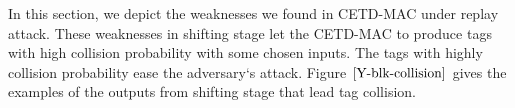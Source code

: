 \documentclass{article}
\begin{document}
In this section, we depict the weaknesses we found in CETD-MAC under replay attack. These weaknesses in shifting stage let the CETD-MAC to produce tags with high collision probability with some chosen inputs. The tags with highly collision probability ease the adversary`s attack. Figure $\ref{Y-blk-collision}$ gives the examples of the outputs from shifting stage that lead tag collision.
\begin{figure}
\centering
{}
\end{figure}
\end{document}

